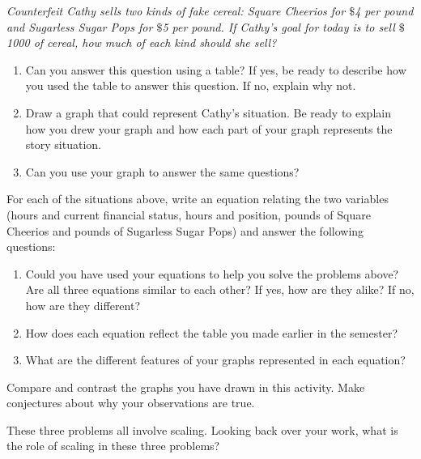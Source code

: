\documentclass{ximera}
\begin{document}
\newpage
\begin{problem} 
\emph{Counterfeit Cathy sells two kinds of fake cereal: Square Cheerios for
$\$$4 per pound and Sugarless Sugar Pops for $\$$5 per pound.  If Cathy's goal for today is to sell $\$$1000 of cereal, how
  much of each kind should she sell?}

\begin{enumerate}
  \item Can you answer this question using a table? If yes, be ready to describe how you used the table to answer this question. If no, explain why not.
    \item Draw a graph that could represent Cathy's situation.  Be ready to explain how you drew your graph and how each part of your graph represents the story situation.
  \item Can you use your graph to answer the same questions?
  \end{enumerate}

\end{problem}

\begin{problem}
For each of the situations above, write an equation relating the two
variables (hours and current financial status, hours and position, 
pounds of Square Cheerios and pounds of Sugarless Sugar Pops) and
answer the following questions:
\begin{enumerate}
\item Could you have used your equations to help you solve the problems
  above? Are all three equations similar to each other? If yes, how are they alike?  If no, how are they different?
   \item How does each equation reflect the table you made earlier in the semester?
  \item  What are the different features of your graphs represented in each equation?
 \end{enumerate}

\end{problem}

\begin{problem} \label{Return5}
Compare and contrast the graphs you have drawn in this activity.  Make conjectures about why your observations are true.

\end{problem}

\begin{problem} 
These three problems all involve scaling.  Looking back over your work, what is the role of scaling in these three problems?


\end{problem}
\end{document}

